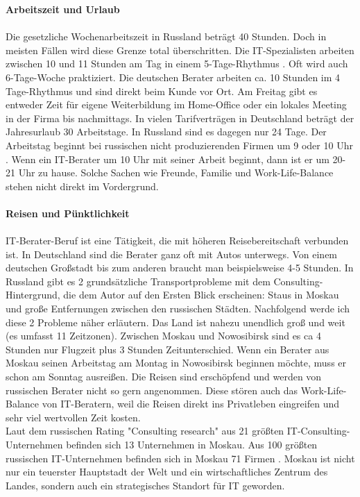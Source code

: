 	 \textbf{Arbeitszeit und Urlaub}\\
	 \\
	 Die gesetzliche Wochenarbeitszeit in Russland beträgt 40 Stunden. Doch in meisten Fällen wird diese Grenze total überschritten. Die IT-Spezialisten arbeiten zwischen 10 und 11 Stunden am Tag in einem 5-Tage-Rhythmus \cite{ArbZeitRU}. 
	  Oft wird auch 6-Tage-Woche praktiziert. Die deutschen Berater arbeiten ca. 10 Stunden  im 4 Tage-Rhythmus und sind direkt beim Kunde vor Ort. Am Freitag gibt es entweder Zeit für eigene Weiterbildung im Home-Office oder ein lokales Meeting in der Firma bis nachmittags.
	 In vielen Tarifverträgen in Deutschland beträgt der Jahresurlaub 30 Arbeitstage. In Russland sind es dagegen nur 24 Tage. Der Arbeitstag beginnt bei russischen nicht produzierenden Firmen um 9 oder 10 Uhr \cite{ArbZeitRU}. Wenn ein IT-Berater um 10 Uhr mit seiner Arbeit beginnt, dann ist er um 20-21 Uhr zu hause. Solche Sachen wie Freunde, Familie und Work-Life-Balance stehen nicht direkt im Vordergrund.   \\ \\
	 \textbf{Reisen und Pünktlichkeit}\\
	 \\
	 IT-Berater-Beruf ist eine Tätigkeit, die mit höheren Reisebereitschaft verbunden ist. In Deutschland sind die Berater ganz oft mit Autos unterwegs. Von einem deutschen Großstadt bis zum anderen braucht man beispielsweise 4-5 Stunden. In Russland gibt es 2 grundsätzliche Transportprobleme mit dem Consulting-Hintergrund, die dem Autor auf den Ersten Blick erscheinen: Staus in Moskau und große Entfernungen zwischen den russischen Städten. Nachfolgend werde ich diese 2 Probleme näher erläutern. Das Land ist nahezu unendlich groß und weit (es umfasst 11 Zeitzonen).
	 Zwischen Moskau und Nowosibirsk sind es ca 4 Stunden nur Flugzeit plus 3 Stunden Zeitunterschied. Wenn ein Berater aus Moskau seinen Arbeitstag am Montag in Nowosibirsk beginnen möchte, muss er schon am Sonntag ausreißen. Die Reisen sind erschöpfend und werden von russischen Berater nicht so gern angenommen. Diese stören auch das Work-Life-Balance von IT-Beratern, weil die Reisen direkt ins Privatleben eingreifen und sehr viel wertvollen Zeit kosten.\\
	 Laut dem russischen Rating "Consulting research" aus 21 größten IT-Consulting-Unternehmen befinden sich 13 Unternehmen in Moskau\cite{RaitConsRU}.
	 Aus 100 größten russischen IT-Unternehmen befinden sich in Moskau 71 Firmen \cite{100BigITConsURU}. 
	 Moskau ist nicht nur ein teuerster Hauptstadt der Welt und ein wirtschaftliches Zentrum des Landes, sondern auch ein strategisches Standort für IT geworden.
